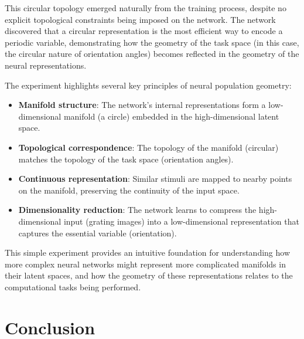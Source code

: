 \documentclass[11pt,a4paper]{article}
\begin{document}
This circular topology emerged naturally from the training process, despite no explicit topological constraints being imposed on the network. The network discovered that a circular representation is the most efficient way to encode a periodic variable, demonstrating how the geometry of the task space (in this case, the circular nature of orientation angles) becomes reflected in the geometry of the neural representations.

The experiment highlights several key principles of neural population geometry:

\begin{itemize}
    \item \textbf{Manifold structure}: The network's internal representations form a low-dimensional manifold (a circle) embedded in the high-dimensional latent space.
    \item \textbf{Topological correspondence}: The topology of the manifold (circular) matches the topology of the task space (orientation angles).
    \item \textbf{Continuous representation}: Similar stimuli are mapped to nearby points on the manifold, preserving the continuity of the input space.
    \item \textbf{Dimensionality reduction}: The network learns to compress the high-dimensional input (grating images) into a low-dimensional representation that captures the essential variable (orientation).
\end{itemize}


This simple experiment provides an intuitive foundation for understanding how more complex neural networks might represent more complicated manifolds in their latent spaces, and how the geometry of these representations relates to the computational tasks being performed.


\section{Conclusion}



\end{document}
